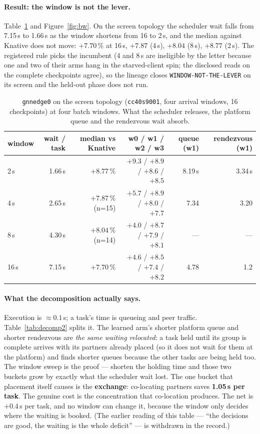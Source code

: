 \documentclass[11pt,a4paper]{article}
\newcommand{\code}[1]{\texttt{\small #1}}
\begin{document}
\paragraph{Result: the window is not the lever.} Table~\ref{tab:bw} and
Figure~\ref{fig:bw}. On the screen topology the scheduler wait falls from 7.15\,s to 1.66\,s as
the window shortens from 16 to 2\,s, and the median against Knative does not move: $+7.70\,\%$
at 16\,s, $+7.87$ (4\,s), $+8.04$ (8\,s), $+8.77$ (2\,s). The registered rule picks the incumbent
(4 and 8\,s are ineligible by the letter because one and two of their arms hang in the
starved-client spin; the disclosed reads on the complete checkpoints agree), so the lineage
closes \code{WINDOW-NOT-THE-LEVER} on its screen and the held-out phase does not run.

\begin{table}[h]
\centering\small
\begin{tabular}{lrrrrr}
\toprule
window & wait / task & median vs Knative & w0 / w1 / w2 / w3 & queue (w1) & rendezvous (w1) \\
\midrule
2\,s & 1.66\,s & $+8.77\,\%$ & $+9.3$ / $+8.9$ / $+8.6$ / $+8.5$ & 8.19\,s & 3.34\,s \\
4\,s & 2.65\,s & $+7.87\,\%$ (n=15) & $+5.7$ / $+8.9$ / $+8.0$ / $+7.7$ & 7.34 & 3.20 \\
8\,s & 4.30\,s & $+8.04\,\%$ (n=14) & $+4.0$ / $+8.7$ / $+7.9$ / $+8.1$ & --- & --- \\
16\,s & 7.15\,s & $\mathbf{+7.70\,\%}$ & $+4.6$ / $+8.5$ / $+7.4$ / $+8.2$ & 4.78 & 1.2 \\
\bottomrule
\end{tabular}
\caption{\code{gnnedge0} on the screen topology (\code{cc40s9001}, four arrival windows, 16
checkpoints) at four batch windows. What the scheduler releases, the platform queue and the
rendezvous wait absorb.}
\label{tab:bw}
\end{table}

\paragraph{What the decomposition actually says.} Execution is $\approx 0.1$\,s; a task's
time is queueing and peer traffic. Table~\ref{tab:decomp2} splits it. The learned arm's shorter
platform queue and shorter rendezvous are \emph{the same waiting relocated}: a task held until
its group is complete arrives with its partners already placed (so it does not wait for them at
the platform) and finds shorter queues because the other tasks are being held too. The window
sweep is the proof --- shorten the holding time and those two buckets grow by exactly what the
scheduler wait lost. The one bucket that placement itself causes is the \textbf{exchange}: co-locating
partners saves \textbf{1.05\,s per task}. The genuine cost is the concentration that co-location
produces. The net is $+0.4$\,s per task, and no window can change it, because the window only
decides where the waiting is booked. (The earlier reading of this table --- ``the decisions are
good, the waiting is the whole deficit'' --- is withdrawn in the record.)
\end{document}
